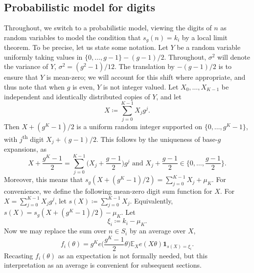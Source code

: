\documentclass[hidelinks,11pt,reqno]{amsart}
\newcommand{\E}{\ensuremath{\mathbb{E}}}
\newcommand{\ind}{\mathbf{1}}
\newcommand{\xb}{X}
\newcommand{\sth}{\textsuperscript{th }}
\newcommand{\sx}[1]{s(#1)}
\newcommand{\sd}[1]{s_{g}(#1)}
\theoremstyle{remark}
\begin{document}
\subsection{Probabilistic model for digits}\label{section prob model} 
Throughout, we switch to a probabilistic model, viewing the digits of $n$ as random variables to model the condition that $\sd{n}=k_{i}$ by a local limit theorem. To be precise, let us state some notation. Let $Y$ be a random variable uniformly taking values in $\{0,\ldots, g-1\}-(g-1)/2$. Throughout, $\sigma^{2}$ will denote the variance of $Y$, $\sigma^{2}=(g^{2}-1)/12$. The translation by $-(g-1)/2$ is to ensure that $Y$ is mean-zero; we will account for this shift where appropriate, and thus note that when $g$ is even, $Y$ is not integer valued. Let $X_{0},\ldots, X_{K-1}$ be independent and identically distributed copies of $Y$, and let
\[\xb\coloneq \sum_{j=0}^{K-1}X_{j}g^{j}.\]
Then $\xb+(g^{K}-1)/2$ is a uniform random integer supported on $\{0,\ldots, g^{K}-1\}$, with $j$\sth digit $X_{j}+(g-1)/2$. This follows by the uniqueness of base-$g$ expansions, as 
\[\xb+\frac{g^{K}-1}{2}=\sum_{j=0}^{K-1}\Big (X_{j}+\frac{g-1}{2}\Big )g^{j} \textrm{ and }X_{j}+\frac{g-1}{2}\in \{0,\ldots, \frac{g-1}{2}\}.\]
Moreover, this means that $\sd{\xb+(g^{K}-1)/2}=\sum_{j=0}^{K-1}X_{j}+\mu_{K}.$ For convenience, we define the following mean-zero digit sum function for $\xb$. For $\xb=\sum_{j=0}^{K-1}X_{j}g^{j}$, let $\sx{\xb}\coloneq \sum_{j=0}^{K-1}X_{j}$. Equivalently, $\sx{\xb}=\sd{\xb+(g^{K}-1)/2}-\mu_{K}$. Let
\begin{equation}\label{xi defn}
    \xi_{i}\coloneq k_{i}-\mu_{K}.
\end{equation}
Now we may replace the sum over $n\in S_{i}$ by an average over $\xb$,  
\begin{equation}\label{lemma expectation version f}
    f_{i}(\theta)=g^{K}e\Big (\frac{g^{K}-1}{2}\theta\Big )\E_{\xb}e(\xb\theta)\ind_{\sx{\xb}=\xi_{i}}.
\end{equation}
Recasting $f_{i}(\theta)$ as an expectation is not formally needed, but this interpretation as an average is convenient for subsequent sections.
\end{document}
